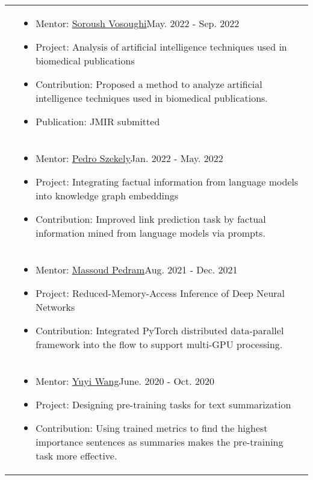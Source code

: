 \documentclass[letterpaper, 10pt]{article}
\begin{document}
\begin{longtable}{p{1.3in}p{4.8in}}
&  \begin{itemize}[leftmargin=10pt, itemsep=-5pt, topsep=0pt,before=\textbf{Dartmouth College}]
    \item Mentor: \href{https://www.cs.dartmouth.edu/~soroush//}{Soroush Vosoughi}\hfill May. 2022 - Sep. 2022
    \item Project: Analysis of artificial intelligence techniques used in biomedical publications\hfill
    \item Contribution: Proposed a method to analyze artificial intelligence techniques used in biomedical publications.
    \item Publication: JMIR submitted
  \end{itemize}\\ 
  
&  \begin{itemize}[leftmargin=10pt, itemsep=-5pt, topsep=0pt,before=\textbf{University of Southern California}]
    \item Mentor: \href{https://usc-isi-i2.github.io/szekely/}{Pedro Szekely}\hfill Jan. 2022 - May. 2022
    \item Project: Integrating factual information from language models into knowledge graph embeddings \hfill 
    \item Contribution: Improved link prediction task by factual information mined from language models via prompts.
  \end{itemize}\\ 

&  \begin{itemize}[leftmargin=10pt, itemsep=-5pt, topsep=0pt,before=\textbf{University of Southern California}]
    \item Mentor: \href{https://mpedram.com/}{Massoud Pedram}\hfill Aug. 2021 - Dec. 2021
    \item Project: Reduced-Memory-Access Inference of Deep Neural Networks\hfill
    \item Contribution: Integrated PyTorch distributed data-parallel framework into the flow to support multi-GPU processing.
  \end{itemize}\\ 

&  \begin{itemize}[leftmargin=10pt, itemsep=-5pt, topsep=0pt,before=\textbf{ETH Zürich}]
    \item Mentor: \href{https://disco.ethz.ch/alumni/yuwang}{Yuyi Wang}\hfill June. 2020 - Oct. 2020
    \item Project: Designing pre-training tasks for text summarization\hfill 
    \item Contribution: Using trained metrics to find the highest importance sentences as summaries makes the pre-training task more effective.
  \end{itemize}\\ 







\end{longtable}
\end{document}
